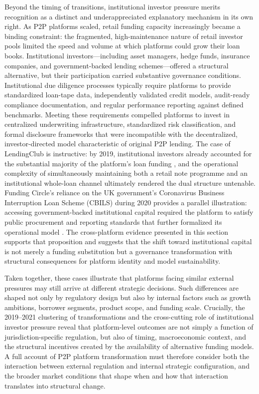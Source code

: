 \documentclass[pdflatex,sn-apa]{sn-jnl}%
\theoremstyle{thmstyleone}%
\theoremstyle{thmstyletwo}%
\theoremstyle{thmstylethree}%
\begin{document}
\textcolor{NavyBlue}{
Beyond the timing of transitions, institutional investor pressure merits recognition as a distinct and underappreciated explanatory mechanism in its own right. As P2P platforms scaled, retail funding capacity increasingly became a binding constraint: the fragmented, high-maintenance nature of retail investor pools limited the speed and volume at which platforms could grow their loan books. Institutional investors—including asset managers, hedge funds, insurance companies, and government-backed lending schemes—offered a structural alternative, but their participation carried substantive governance conditions. Institutional due diligence processes typically require platforms to provide standardized loan-tape data, independently validated credit models, audit-ready compliance documentation, and regular performance reporting against defined benchmarks. Meeting these requirements compelled platforms to invest in centralized underwriting infrastructure, standardized risk classification, and formal disclosure frameworks that were incompatible with the decentralized, investor-directed model characteristic of original P2P lending. The case of LendingClub is instructive: by 2019, institutional investors already accounted for the substantial majority of the platform's loan funding \citep{dan_ennis_lendingclub_2020}, and the operational complexity of simultaneously maintaining both a retail note programme and an institutional whole-loan channel ultimately rendered the dual structure untenable. Funding Circle's reliance on the UK government's Coronavirus Business Interruption Loan Scheme (CBILS) during 2020 provides a parallel illustration: accessing government-backed institutional capital required the platform to satisfy public procurement and reporting standards that further formalized its operational model \citep{hm_treasury_improving_2024}. The cross-platform evidence presented in this section supports that proposition and suggests that the shift toward institutional capital is not merely a funding substitution but a governance transformation with structural consequences for platform identity and model sustainability.
}

\textcolor{NavyBlue}{
Taken together, these cases illustrate that platforms facing similar external pressures may still arrive at different strategic decisions. Such differences are shaped not only by regulatory design but also by internal factors such as growth ambitions, borrower segments, product scope, and funding scale. Crucially, the 2019--2021 clustering of transformations and the cross-cutting role of institutional investor pressure reveal that platform-level outcomes are not simply a function of jurisdiction-specific regulation, but also of timing, macroeconomic context, and the structural incentives created by the availability of alternative funding models. A full account of P2P platform transformation must therefore consider both the interaction between external regulation and internal strategic configuration, and the broader market conditions that shape when and how that interaction translates into structural change.
}
\end{document}
